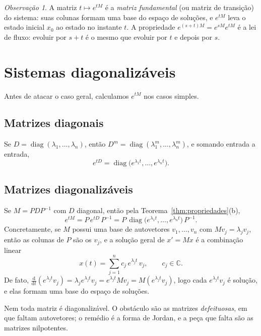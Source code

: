 \documentclass[11pt,a4paper]{amsart}
\newcommand{\C}{\mathbb{C}}
\renewcommand{\d}{\mathrm{d}}
\DeclareMathOperator{\diag}{diag}
\theoremstyle{plain}
\theoremstyle{definition}
\theoremstyle{remark}
\newtheorem{observacao}[teorema]{Observação}
\begin{document}
\begin{observacao}
A matriz $t\mapsto e^{tM}$ \'e a \emph{matriz fundamental} (ou matriz de
transi\c{c}\~ao) do sistema: suas colunas formam uma base do espa\c{c}o de
solu\c{c}\~oes, e $e^{tM}$ leva o estado inicial $x_0$ ao estado no instante
$t$. A propriedade $e^{(s+t)M}=e^{sM}e^{tM}$ \'e a lei de fluxo: evoluir por
$s+t$ \'e o mesmo que evoluir por $t$ e depois por $s$.
\end{observacao}

\section{Sistemas diagonaliz\'aveis}
\label{sec:diag}

Antes de atacar o caso geral, calculamos $e^{tM}$ nos casos simples.

\subsection{Matrizes diagonais}
Se $D=\diag(\lambda_1,\dots,\lambda_n)$, ent\~ao
$D^m=\diag(\lambda_1^m,\dots,\lambda_n^m)$, e somando entrada a entrada,
\[
  e^{tD} = \diag\!\big(e^{\lambda_1 t},\dots,e^{\lambda_n t}\big).
\]

\subsection{Matrizes diagonaliz\'aveis}
Se $M = PDP^{-1}$ com $D$ diagonal, ent\~ao pela
Teorema~\ref{thm:propriedades}(b),
\[
  e^{tM} = P\,e^{tD}\,P^{-1}
         = P\,\diag\!\big(e^{\lambda_1 t},\dots,e^{\lambda_n t}\big)\,P^{-1}.
\]
Concretamente, se $M$ possui uma base de autovetores $v_1,\dots,v_n$ com
$Mv_j=\lambda_j v_j$, ent\~ao as colunas de $P$ s\~ao os $v_j$, e a
solu\c{c}\~ao geral de $x'=Mx$ \'e a combina\c{c}\~ao linear
\[
  x(t) = \sum_{j=1}^{n} c_j\,e^{\lambda_j t}\,v_j,
  \qquad c_j\in\C.
\]
De fato, $\frac{\d}{\d t}(e^{\lambda_j t}v_j)=\lambda_j e^{\lambda_j t}v_j
= e^{\lambda_j t}Mv_j = M(e^{\lambda_j t}v_j)$, logo cada $e^{\lambda_j t}v_j$
\'e solu\c{c}\~ao, e elas formam uma base do espa\c{c}o de solu\c{c}\~oes.

Nem toda matriz \'e diagonaliz\'avel. O obst\'aculo s\~ao as matrizes
\emph{defeituosas}, em que faltam autovetores; o rem\'edio \'e a forma de
Jordan, e a pe\c{c}a que falta s\~ao as matrizes nilpotentes.
\end{document}

